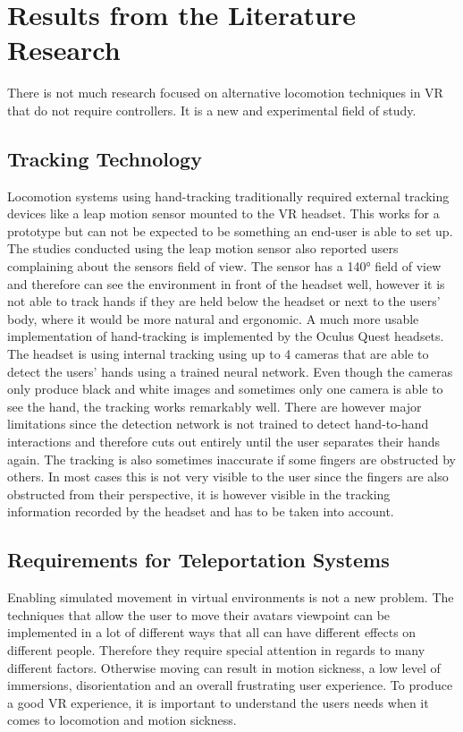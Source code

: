 \chapter{Results from the Literature Research}

There is not much research focused on alternative locomotion techniques in VR that do not require controllers. It is a new and experimental field of study.

\section{Tracking Technology}
Locomotion systems using hand-tracking traditionally required external tracking devices like a leap motion sensor mounted to the VR headset. %
This works for a prototype but can not be expected to be something an end-user is able to set up. The studies conducted using the leap motion sensor also reported users complaining about the sensors field of view. %
The sensor has a 140° field of view and therefore can see the environment in front of the headset well, however it is not able to track hands if they are held below the headset or next to the users' body, where it would be more natural and ergonomic. A much more usable implementation of hand-tracking is implemented by the Oculus Quest headsets. %
The headset is using internal tracking using up to 4 cameras that are able to detect the users' hands using a trained neural network. %
Even though the cameras only produce black and white images and sometimes only one camera is able to see the hand, the tracking works remarkably well. There are however major limitations since the detection network is not trained to detect hand-to-hand interactions and therefore cuts out entirely until the user separates their hands again. The tracking is also sometimes inaccurate if some fingers are obstructed by others. In most cases this is not very visible to the user since the fingers are also obstructed from their perspective, it is however visible in the tracking information recorded by the headset and has to be taken into account. 

\section{Requirements for Teleportation Systems}
Enabling simulated movement in virtual environments is not a new problem. The techniques that allow the user to move their avatars viewpoint can be implemented in a lot of different ways that all can have different effects on different people. Therefore they require special attention in regards to many different factors. Otherwise moving can result in motion sickness, a low level of immersions, disorientation and an overall frustrating user experience. To produce a good VR experience, it is important to understand the users needs when it comes to locomotion and motion sickness. 

